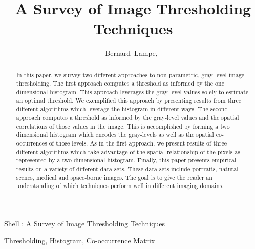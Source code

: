 \documentclass[journal]{IEEEtran}
\begin{document}
\title{A Survey of Image Thresholding Techniques}

\author{Bernard~Lampe,~}

%
{Shell \MakeLowercase{\Lampe}: A Survey of Image Thresholding Techniques}

\maketitle

\begin{abstract}
In this paper, we survey two different approaches to non-parametric, gray-level image thresholding. The first approach computes a threshold as informed by the one dimensional histogram. This approach leverages the gray-level values solely to estimate an optimal threshold. We exemplified this approach by presenting results from three different algorithms which leverage the histogram in different ways. The second approach computes a threshold as informed by the gray-level values and the spatial correlations of those values in the image. This is accomplished by forming a two dimensional histogram which encodes the gray-levels as well as the spatial co-occurrences of those levels. As in the first approach, we present results of three different algorithms which take advantage of the spatial relationship of the pixels as represented by a two-dimensional histogram. Finally, this paper presents empirical results on a variety of different data sets. These data sets include portraits, natural scenes, medical and space-borne images. The goal is to give the reader an understanding of which techniques perform well in different imaging domains.
\end{abstract}

\begin{IEEEkeywords}
Thresholding, Histogram, Co-occurrence Matrix
\end{IEEEkeywords}

\end{document}
